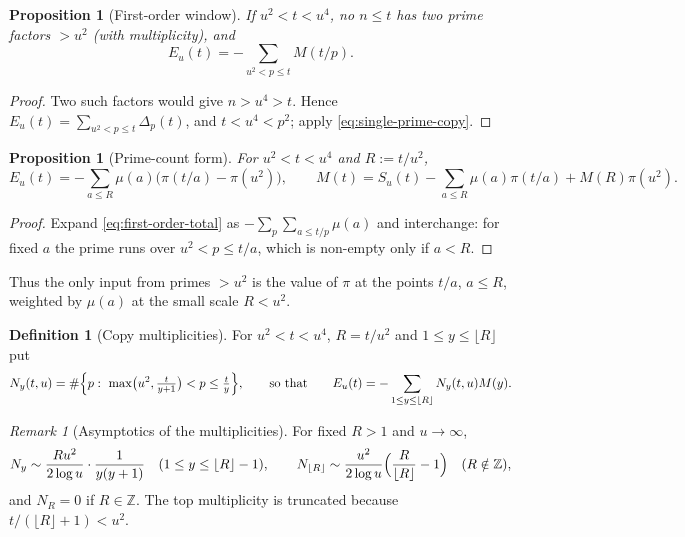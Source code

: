 \documentclass[11pt]{amsart}
\numberwithin{equation}{section}
\theoremstyle{plain}
\newtheorem{proposition}[theorem]{Proposition}
\theoremstyle{definition}
\newtheorem{definition}[theorem]{Definition}
\theoremstyle{remark}
\newtheorem{remark}[theorem]{Remark}
\begin{document}
\begin{proposition}[First-order window]
\label{prop:linear-new-primes}
If $u^2<t<u^4$, no $n\le t$ has two prime factors $>u^2$ (with
multiplicity), and
\begin{equation}
\label{eq:first-order-total}
  E_u(t)=-\sum_{u^2<p\le t}M(t/p).
\end{equation}
\end{proposition}

\begin{proof}
Two such factors would give $n>u^4>t$. Hence $E_u(t)=\sum_{u^2<p\le t}
\Delta_p(t)$, and $t<u^4<p^2$; apply \eqref{eq:single-prime-copy}.
\end{proof}

\begin{proposition}[Prime-count form]
\label{prop:prime_count_form}
For $u^2<t<u^4$ and $R:=t/u^2$,
\begin{equation}
\label{eq:prime_count_form}
  E_u(t)=-\sum_{a\le R}\mu(a)\bigl(\pi(t/a)-\pi(u^2)\bigr),
  \qquad
  M(t)=S_u(t)-\sum_{a\le R}\mu(a)\pi(t/a)+M(R)\pi(u^2).
\end{equation}
\end{proposition}

\begin{proof}
Expand \eqref{eq:first-order-total} as $-\sum_{p}\sum_{a\le t/p}\mu(a)$ and
interchange: for fixed $a$ the prime runs over $u^2<p\le t/a$, which is
non-empty only if $a<R$.
\end{proof}

Thus the only input from primes $>u^2$ is the value of $\pi$ at the points
$t/a$, $a\le R$, weighted by $\mu(a)$ at the small scale $R<u^2$.

\begin{definition}[Copy multiplicities]
\label{def:copy-multiplicity}
For $u^2<t<u^4$, $R=t/u^2$ and $1\le y\le\lfloor R\rfloor$ put
\begin{equation}
\label{eq:Ny-exact}
  N_y(t,u)=\#\Bigl\{p:\ \max\bigl(u^2,\tfrac{t}{y+1}\bigr)<p\le\tfrac ty\Bigr\},
  \qquad\text{so that}\qquad
  E_u(t)=-\sum_{1\le y\le\lfloor R\rfloor}N_y(t,u)M(y).
\end{equation}
\end{definition}

\begin{remark}[Asymptotics of the multiplicities]
\label{rem:copy-count-asymptotic}
For fixed $R>1$ and $u\to\infty$,
\begin{equation}
\label{eq:Ny-fixed-R}
  N_y\sim\frac{Ru^2}{2\log u}\cdot\frac1{y(y+1)}\quad(1\le y\le\lfloor R\rfloor-1),
  \qquad
  N_{\lfloor R\rfloor}\sim\frac{u^2}{2\log u}\Bigl(\frac R{\lfloor R\rfloor}-1\Bigr)
  \quad(R\notin\mathbb{Z}),
\end{equation}
and $N_R=0$ if $R\in\mathbb{Z}$. The top multiplicity is truncated because
$t/(\lfloor R\rfloor+1)<u^2$.
\end{remark}
\end{document}
